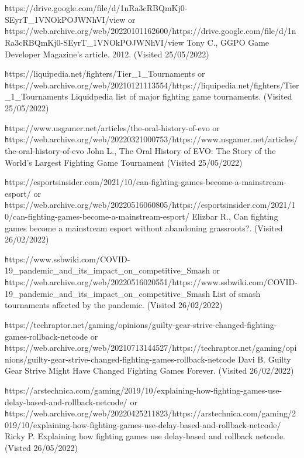 \documentclass{entcs}
\begin{document}
\begin{thebibliography}{25}

 {\texttt https://drive.google.com/file/d/1nRa3cRBQmKj0-SEyrT\_1VNOkPOJWNhVI/view} or 
{\texttt https://web.archive.org/web/20220101162600/https://drive.google.com/file/d/1nRa3cRBQmKj0-SEyrT\_1VNOkPOJWNhVI/view} 
Tony C., GGPO Game Developer Magazine's article. 2012. (Visited 25/05/2022)

 {\texttt https://liquipedia.net/fighters/Tier\_1\_Tournaments} or 
{\texttt https://web.archive.org/web/20210121113554/https://liquipedia.net/fighters/Tier\_1\_Tournaments} 
Liquidpedia list of major fighting game tournaments. (Visited 25/05/2022)

 {\texttt https://www.usgamer.net/articles/the-oral-history-of-evo} or 
{\texttt https://web.archive.org/web/20220321000753/https://www.usgamer.net/articles/the-oral-history-of-evo} 
John L., The Oral History of EVO: The Story of the World's Largest Fighting Game Tournament (Visited 25/05/2022)

 {\texttt https://esportsinsider.com/2021/10/can-fighting-games-become-a-mainstream-esport/} or 
{\texttt https://web.archive.org/web/20220516060805/https://esportsinsider.com/2021/10/can-fighting-games-become-a-mainstream-esport/} 
Elizbar R., Can fighting games become a mainstream esport without abandoning grassroots?. (Visited 26/02/2022) 

 {\texttt https://www.ssbwiki.com/COVID-19\_pandemic\_and\_its\_impact\_on\_competitive\_Smash} or {\texttt https://web.archive.org/web/20220516020551/https://www.ssbwiki.com/COVID-19\_pandemic\_and\_its\_impact\_on\_competitive\_Smash} List of smash tournaments affected by the pandemic. (Visited 26/02/2022) 

 {\texttt https://techraptor.net/gaming/opinions/guilty-gear-strive-changed-fighting-games-rollback-netcode} or {\texttt https://web.archive.org/web/20210713144527/https://techraptor.net/gaming/opinions/guilty-gear-strive-changed-fighting-games-rollback-netcode} Davi B. Guilty Gear Strive Might Have Changed Fighting Games Forever. (Visited 26/02/2022)

 {\texttt https://arstechnica.com/gaming/2019/10/explaining-how-fighting-games-use-delay-based-and-rollback-netcode/} or {\texttt https://web.archive.org/web/20220425211823/https://arstechnica.com/gaming/2019/10/explaining-how-fighting-games-use-delay-based-and-rollback-netcode/} Ricky P. Explaining how fighting games use delay-based and rollback netcode. (Visted 26/05/2022)


\end{thebibliography}
\end{document}
